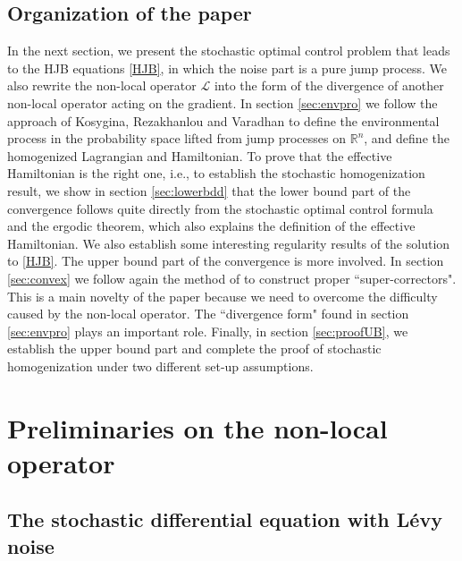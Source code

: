 \documentclass[11pt,reqno]{amsart}
\theoremstyle{definition}
\theoremstyle{remark}
\numberwithin{equation}{section}
\newcommand{\R}{{\mathbb{R}}}
\begin{document}
\subsection*{Organization of the paper} In the next section, we present the stochastic optimal control problem that leads to the HJB equations \eqref{HJB}, in which the noise part is a pure jump process. We also rewrite the non-local operator $\mathscr{L}$ into the form of the divergence of another non-local operator acting on the gradient. In section \ref{sec:envpro} we follow the approach of Kosygina, Rezakhanlou and Varadhan \cite{KRV06} to define the environmental process in the probability space lifted from jump processes on $\R^n$, and define the homogenized Lagrangian and Hamiltonian. To prove that the effective Hamiltonian is the right one, i.e., to establish the stochastic homogenization result, we show in section \ref{sec:lowerbdd} that the lower bound part of the convergence follows quite directly from the stochastic optimal control formula and the ergodic theorem, which also explains the definition of the effective Hamiltonian. We also establish some interesting regularity results of the solution to \eqref{HJB}. The upper bound part of the convergence is more involved. In section \ref{sec:convex} we follow again the method of \cite{KRV06} to construct proper ``super-correctors". This is a main novelty of the paper because we need to overcome the difficulty caused by the non-local operator. The ``divergence form" found in section \ref{sec:envpro} plays an important role. Finally, in section \ref{sec:proofUB}, we establish the upper bound part and complete the proof of stochastic homogenization under two different set-up assumptions. 


\section{Preliminaries on the non-local operator} 

\subsection{The stochastic differential equation with L\'{e}vy noise}
\label{sec:jump diff}
\end{document}
